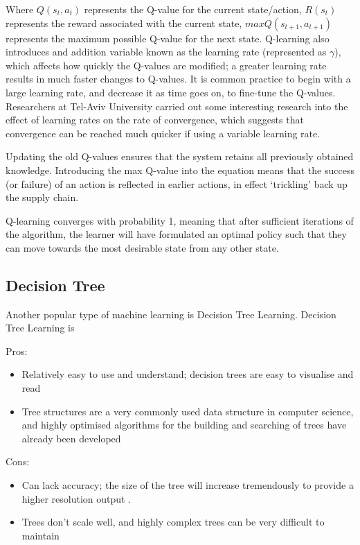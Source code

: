 \documentclass[a4paper,oneside]{report}
\begin{document}
Where $Q(s_t, a_t)$ represents the Q-value for the current state/action, $R(s_t)$ represents the reward associated with the current state, $max Q(s_{t+1}, a_{t+1})$ represents the maximum possible Q-value for the next state. Q-learning also introduces and addition variable known as the learning rate (represented as $\gamma$), which affects how quickly the Q-values are modified; a greater learning rate results in much faster changes to Q-values. It is common practice to begin with a large learning rate, and decrease it as time goes on, to fine-tune the Q-values. Researchers at Tel-Aviv University carried out some interesting research into the effect of learning rates on the rate of convergence, which suggests that convergence can be reached much quicker if using a variable learning rate.

Updating the old Q-values ensures that the system retains all previously obtained knowledge. Introducing the max Q-value into the equation means that the success (or failure) of an action is reflected in earlier actions, in effect `trickling' back up the supply chain.

Q-learning converges with probability 1, meaning that after sufficient iterations of the algorithm, the learner will have formulated an optimal policy such that they can move towards the most desirable state from any other state.

\subsection{Decision Tree}

Another popular type of machine learning is Decision Tree Learning. Decision Tree Learning is 

Pros:
\begin{itemize}
	\item Relatively easy to use and understand; decision trees are easy to visualise and read
	\item Tree structures are a very commonly used data structure in computer science, and highly optimised algorithms for the building and searching of trees have already been developed
\end{itemize}

\noindent Cons:
\begin{itemize}
	\item Can lack accuracy; the size of the tree will increase tremendously to provide a higher resolution output \cite{schwab2004ai}.
	\item Trees don't scale well, and highly complex trees can be very difficult to maintain
\end{itemize}
\end{document}
